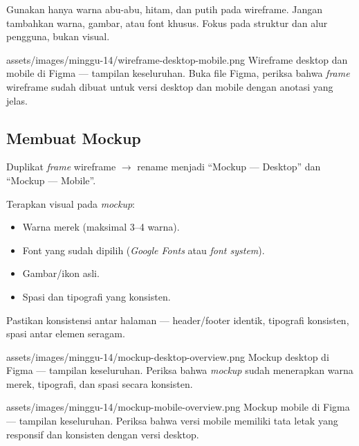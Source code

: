 \begin{tip}
Gunakan hanya warna abu-abu, hitam, dan putih pada wireframe. Jangan tambahkan warna, gambar, atau font khusus. Fokus pada struktur dan alur pengguna, bukan visual.
\end{tip}

\begin{tangkapanlayar}
  {assets/images/minggu-14/wireframe-desktop-mobile.png}
  {Wireframe desktop dan mobile di Figma --- tampilan keseluruhan.}
  {Buka file Figma, periksa bahwa \emph{frame} wireframe sudah dibuat untuk versi desktop dan mobile dengan anotasi yang jelas.}
\end{tangkapanlayar}

\subsection{Membuat Mockup}
\label{subsec:mockup}

\begin{langkah}
  \item Duplikat \emph{frame} wireframe $\rightarrow$ rename menjadi ``Mockup --- Desktop'' dan ``Mockup --- Mobile''.
  \item Terapkan visual pada \emph{mockup}:
  \begin{itemize}
    \item Warna merek (maksimal 3--4 warna).
    \item Font yang sudah dipilih (\emph{Google Fonts} atau \emph{font system}).
    \item Gambar/ikon asli.
    \item Spasi dan tipografi yang konsisten.
  \end{itemize}
  \item Pastikan konsistensi antar halaman --- header/footer identik, tipografi konsisten, spasi antar elemen seragam.
\end{langkah}

\begin{tangkapanlayar}
  {assets/images/minggu-14/mockup-desktop-overview.png}
  {Mockup desktop di Figma --- tampilan keseluruhan.}
  {Periksa bahwa \emph{mockup} sudah menerapkan warna merek, tipografi, dan spasi secara konsisten.}
\end{tangkapanlayar}

\begin{tangkapanlayar}
  {assets/images/minggu-14/mockup-mobile-overview.png}
  {Mockup mobile di Figma --- tampilan keseluruhan.}
  {Periksa bahwa versi mobile memiliki tata letak yang responsif dan konsisten dengan versi desktop.}
\end{tangkapanlayar}

